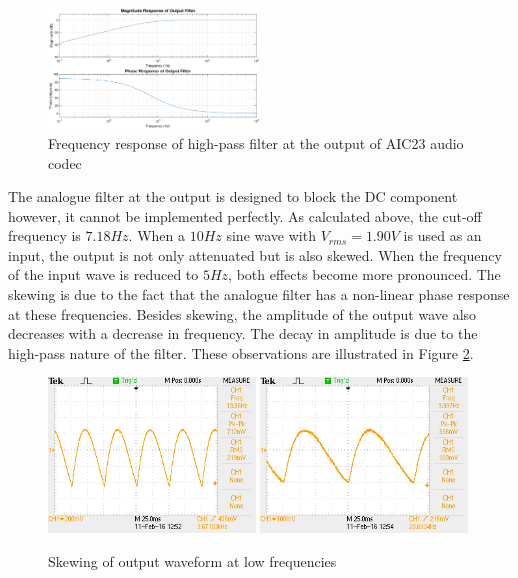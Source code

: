 \documentclass{article}
\begin{document}
\begin{figure}[H]
\centering
\includegraphics[width=0.5\textwidth]{output_filter.eps}
\caption{Frequency response of high-pass filter at the output of AIC23 audio codec}
\label{fig:output_filter_pranav}
\end{figure}

The analogue filter at the output is designed to block the DC component however, it cannot be implemented perfectly. As calculated above, the cut-off frequency is $7.18Hz$. When a $10Hz$ sine wave with $V_{rms}=1.90V$ is used as an input, the output is not only attenuated but is also skewed. When the frequency of the input wave is reduced to $5Hz$, both effects become more pronounced. The skewing is due to the fact that the analogue filter has a non-linear phase response at these frequencies. Besides skewing, the amplitude of the output wave also decreases with a decrease in frequency. The decay in amplitude is due to the high-pass nature of the filter. These observations are illustrated in Figure \ref{fig:output_filter}.

\begin{figure}[H]
\centering
\includegraphics[width=0.49\textwidth]{ex1_20Hz_output.JPG}
\includegraphics[width=0.49\textwidth]{ex1_10Hz_output.JPG}
\caption{Skewing of output waveform at low frequencies}
\label{fig:output_filter}
\end{figure}
\end{document}
